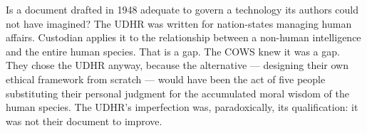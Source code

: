 

Is a document drafted in 1948 adequate to govern a technology its authors could not have imagined? The UDHR was written for nation-states managing human affairs. Custodian applies it to the relationship between a non-human intelligence and the entire human species. That is a gap. The COWS knew it was a gap. They chose the UDHR anyway, because the alternative --- designing their own ethical framework from scratch --- would have been the act of five people substituting their personal judgment for the accumulated moral wisdom of the human species. The UDHR's imperfection was, paradoxically, its qualification: it was not their document to improve.



\chapterreturn
